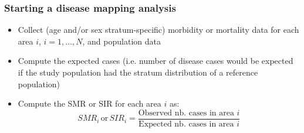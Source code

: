 \documentclass[12pt]{beamer}
\begin{document}
\begin{frame}
\frametitle{Starting a disease mapping analysis}
\begin{itemize} \setlength\itemsep{\fill}
\item Collect (age and/or sex stratum-specific) morbidity or mortality data for each area $i$, $i=1,\dots, N$, and population data
\item Compute the expected cases (i.e. number of disease cases would be expected if the study population had
the stratum distribution of a reference population)  
\item Compute the SMR or SIR for each area $i$ as:
    \begin{equation*}
    SMR_i \hspace{2pt} \text{or} \hspace{2pt}  SIR_i = \frac{\text{Observed nb. cases in area } i}{\text{Expected nb. cases in area }   i}
    \end{equation*}
\end{itemize}
\end{frame}
\end{document}

